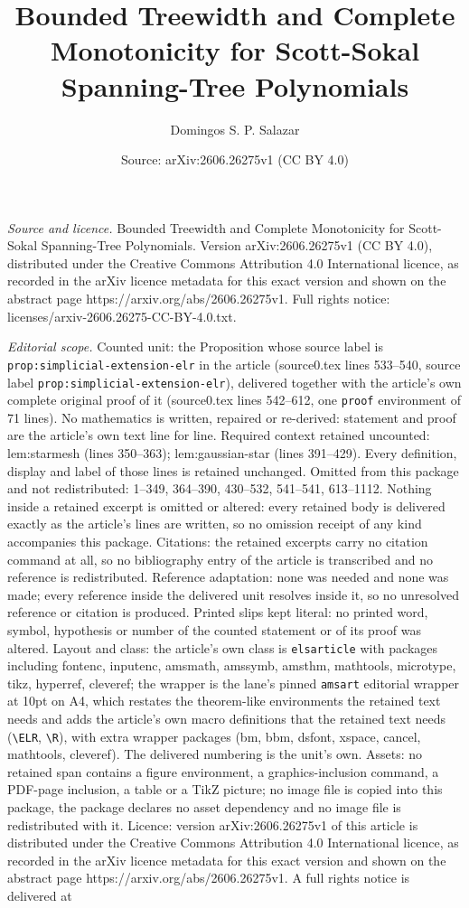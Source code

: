 \documentclass[10pt,a4paper]{amsart}
\title[Bounded Treewidth and Complete Monotonicity for Scott-Sokal ]{Bounded Treewidth and Complete Monotonicity for Scott-Sokal Spanning-Tree Polynomials}
\author{Domingos S. P. Salazar}
\date{Source: arXiv:2606.26275v1 (CC BY 4.0)}
\begin{document}
\maketitle

\noindent\emph{Source and licence.} Bounded Treewidth and Complete Monotonicity for Scott-Sokal Spanning-Tree Polynomials. Version arXiv:2606.26275v1 (CC BY 4.0), distributed under the Creative Commons Attribution 4.0 International licence, as recorded in the arXiv licence metadata for this exact version and shown on the abstract page https://arxiv.org/abs/2606.26275v1. Full rights notice: licenses/arxiv-2606.26275-CC-BY-4.0.txt.\par\smallskip

\noindent\textit{Editorial scope.} Counted unit: the Proposition whose source label is \texttt{prop:simplicial-extension-elr} in the article (source0.tex lines 533--540, source label \texttt{prop:simplicial-extension-elr}), delivered together with the article's own complete original proof of it (source0.tex lines 542--612, one \texttt{proof} environment of 71 lines). No mathematics is written, repaired or re-derived: statement and proof are the article's own text line for line. Required context retained uncounted: lem:starmesh (lines 350--363); lem:gaussian-star (lines 391--429). Every definition, display and label of those lines is retained unchanged. Omitted from this package and not redistributed: 1--349, 364--390, 430--532, 541--541, 613--1112. Nothing inside a retained excerpt is omitted or altered: every retained body is delivered exactly as the article's lines are written, so no omission receipt of any kind accompanies this package. Citations: the retained excerpts carry no citation command at all, so no bibliography entry of the article is transcribed and no reference is redistributed. Reference adaptation: none was needed and none was made; every reference inside the delivered unit resolves inside it, so no unresolved reference or citation is produced. Printed slips kept literal: no printed word, symbol, hypothesis or number of the counted statement or of its proof was altered. Layout and class: the article's own class is \texttt{elsarticle} with packages including fontenc, inputenc, amsmath, amssymb, amsthm, mathtools, microtype, tikz, hyperref, cleveref; the wrapper is the lane's pinned \texttt{amsart} editorial wrapper at 10pt on A4, which restates the theorem-like environments the retained text needs and adds the article's own macro definitions that the retained text needs (\texttt{\textbackslash ELR}, \texttt{\textbackslash R}), with extra wrapper packages (bm, bbm, dsfont, xspace, cancel, mathtools, cleveref). The delivered numbering is the unit's own. Assets: no retained span contains a figure environment, a graphics-inclusion command, a PDF-page inclusion, a table or a TikZ picture; no image file is copied into this package, the package declares no asset dependency and no image file is redistributed with it. Licence: version arXiv:2606.26275v1 of this article is distributed under the Creative Commons Attribution 4.0 International licence, as recorded in the arXiv licence metadata for this exact version and shown on the abstract page https://arxiv.org/abs/2606.26275v1. A full rights notice is delivered at 
\end{document}
